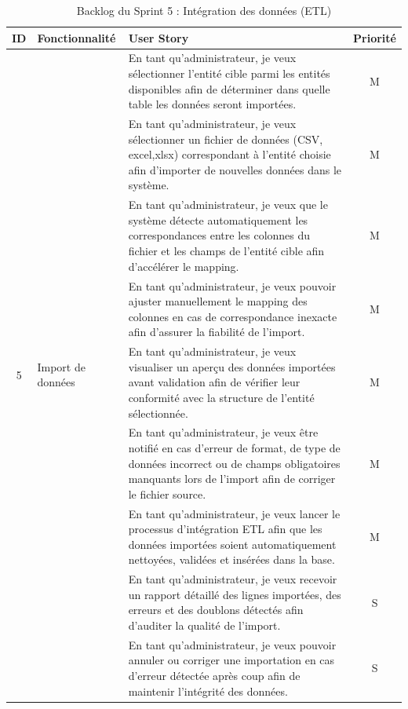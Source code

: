 \begin{table}[H]
\centering
\caption{Backlog du Sprint 5 : Intégration des données (ETL)}
\label{tab:sprint5_backlog}
\begin{tabular}{|c|p{3.5cm}|p{10cm}|c|}
\hline
\textbf{ID} & \textbf{Fonctionnalité} & \textbf{User Story} & \textbf{Priorité} \\
\hline
\multirow{9}{*}{5} & \multirow{9}{*}{Import de données} 
& En tant qu'administrateur, je veux sélectionner l'entité cible parmi les entités disponibles afin de déterminer dans quelle table les données seront importées. & M \\
\cline{3-4}
& & En tant qu'administrateur, je veux sélectionner un fichier de données (CSV, excel,xlsx) correspondant à l'entité choisie afin d'importer de nouvelles données dans le système. & M \\
\cline{3-4}
& & En tant qu'administrateur, je veux que le système détecte automatiquement les correspondances entre les colonnes du fichier et les champs de l'entité cible afin d'accélérer le mapping. & M \\
\cline{3-4}
& & En tant qu'administrateur, je veux pouvoir ajuster manuellement le mapping des colonnes en cas de correspondance inexacte afin d'assurer la fiabilité de l'import. & M \\
\cline{3-4}
& & En tant qu'administrateur, je veux visualiser un aperçu des données importées avant validation afin de vérifier leur conformité avec la structure de l'entité sélectionnée. & M \\
\cline{3-4}
& & En tant qu'administrateur, je veux être notifié en cas d'erreur de format, de type de données incorrect ou de champs obligatoires manquants lors de l'import afin de corriger le fichier source. & M \\
\cline{3-4}
& & En tant qu'administrateur, je veux lancer le processus d'intégration ETL afin que les données importées soient automatiquement nettoyées, validées et insérées dans la base. & M \\
\cline{3-4}
& & En tant qu'administrateur, je veux recevoir un rapport détaillé des lignes importées, des erreurs et des doublons détectés afin d'auditer la qualité de l'import. & S \\
\cline{3-4}
& & En tant qu'administrateur, je veux pouvoir annuler ou corriger une importation en cas d'erreur détectée après coup afin de maintenir l'intégrité des données. & S \\
\hline
\end{tabular}
\end{table}

